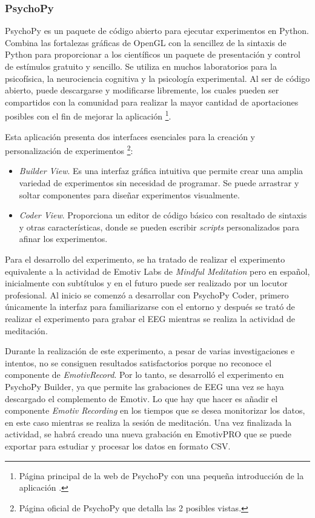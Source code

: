 \subsubsection{PsychoPy}
PsychoPy es un paquete de código abierto para ejecutar experimentos en Python. Combina las fortalezas gráficas de OpenGL con la sencillez de la sintaxis de Python para proporcionar a los científicos un paquete de presentación y control de estímulos gratuito y sencillo. Se utiliza en muchos laboratorios para la psicofísica, la neurociencia cognitiva y la psicología experimental.
Al ser de código abierto, puede descargarse y modificarse libremente, los cuales pueden ser compartidos con la comunidad para realizar la mayor cantidad de aportaciones posibles con el fin de mejorar la aplicación \cite{psychopyOverview}\footnote{Página principal de la web de PsychoPy con una pequeña introducción de la aplicación \cite{psychopyOverview}.}.

Esta aplicación presenta dos interfaces esenciales para la creación y personalización de experimentos \cite{psychopyGettingStarted}\footnote{Página oficial de PsychoPy que detalla las 2 posibles vistas\cite{psychopyGettingStarted}.}:
\begin{itemize}
    \item \textit{Builder View}. Es una interfaz gráfica intuitiva que permite crear una amplia variedad de experimentos sin necesidad de programar. Se puede arrastrar y soltar componentes para diseñar experimentos visualmente.
    \item \textit{Coder View}. Proporciona un editor de código básico con resaltado de sintaxis y otras características, donde se pueden escribir \textit{scripts} personalizados para afinar los experimentos.
\end{itemize}

Para el desarrollo del experimento, se ha tratado de realizar el experimento equivalente a la actividad de Emotiv Labs de \textit{Mindful Meditation} pero en español, inicialmente con subtítulos y en el futuro puede ser realizado por un locutor profesional. Al inicio se comenzó a desarrollar con PsychoPy Coder, primero únicamente la interfaz para familiarizarse con el entorno y después se trató de realizar el experimento para grabar el EEG mientras se realiza la actividad de meditación.

Durante la realización de este experimento, a pesar de varias investigaciones e intentos, no se consiguen resultados satisfactorios porque no reconoce el componente de \textit{EmotivRecord}. Por lo tanto, se desarrolló el experimento en PsychoPy Builder, ya que permite las grabaciones de EEG una vez se haya descargado el complemento de Emotiv. Lo que hay que hacer es añadir el componente \textit{Emotiv Recording} en los tiempos que se desea monitorizar los datos, en este caso mientras se realiza la sesión de meditación. Una vez finalizada la actividad, se habrá creado una nueva grabación en EmotivPRO que se puede exportar para estudiar y procesar los datos en formato CSV.

